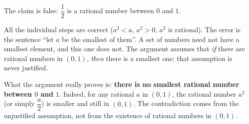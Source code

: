 The claim is false: $\dfrac{1}{2}$ is a rational number between $0$ and $1$.

All the individual steps are correct ($a^2<a$, $a^2>0$, $a^2$ is rational). The error is the sentence ``let $a$ be the smallest of them''. A set of numbers need not have a smallest element, and this one does not. The argument assumes that \emph{if} there are rational numbers in $(0,1)$, \emph{then} there is a smallest one; that assumption is never justified.

What the argument really proves is: \textbf{there is no smallest rational number between $0$ and $1$}. Indeed, for any rational $a$ in $(0,1)$, the rational number $a^2$ (or simply $\dfrac {a}{2}$) is smaller and still in $(0,1)$. The contradiction comes from the unjustified assumption, not from the existence of rational numbers in $(0,1)$.
